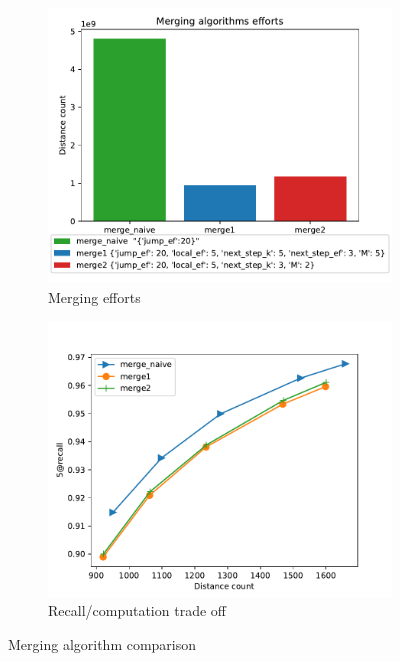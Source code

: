 \documentclass{article}
\begin{document}
\begin{figure}
\begin{subfigure}{.5\textwidth}
  \centering
  \includegraphics[width=1.\linewidth]{figs/merge-effort-comparison.pdf}
  \caption{Merging efforts}
  \label{fig:sfig1}
\end{subfigure}%
\begin{subfigure}{.5\textwidth}
  \centering
  \includegraphics[width=1.\linewidth]{figs/recall-comparsion.pdf}
  \caption{Recall/computation trade off}
  \label{fig:sfig2}
\end{subfigure}
\caption{Merging algorithm comparison}
\label{fig:fig}
\end{figure}
\end{document}
